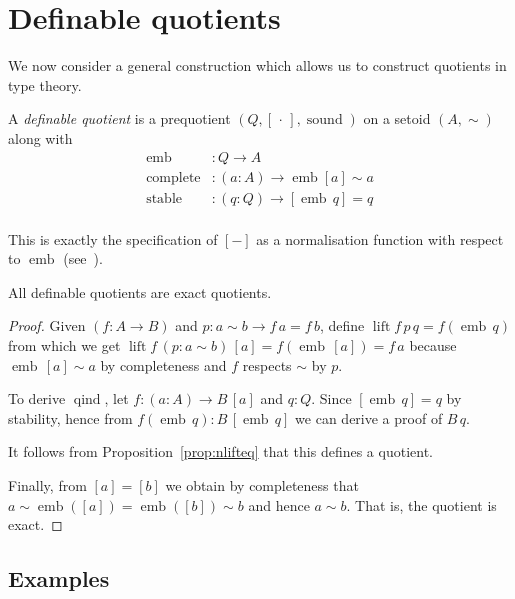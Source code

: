 \documentclass[envcountsame]{llncs}
\newcommand{\dotph}{\,\cdot\,} %
\providecommand{\class}[1]{[#1]}
\DeclareMathOperator{\sound}{sound}
\DeclareMathOperator{\qind}{qind}
\DeclareMathOperator{\emb}{emb}
\DeclareMathOperator{\complete}{complete}
\DeclareMathOperator{\stable}{stable}
\DeclareMathOperator{\lift}{lift}
\renewcommand{\equiv}{=}
\begin{document}
\section{Definable quotients}\label{sec:defquotients}

We now consider a general construction which allows us to construct quotients in type theory.

\begin{definition}\label{def:defquotients}
A \emph{definable quotient} is a prequotient $(Q, \class{\dotph}, \sound)$ on a setoid $(A,\sim)$ along with
\begin{align*}
\emb &: Q \to A\\
\complete &: (a : A) \to \emb {\class a} \sim a\\
\stable &: (q:Q) \to \class{\emb\,q} \equiv q\\
\end{align*}
\end{definition}

This is exactly the specification of  $\class{-}$ as a
normalisation function with respect to $\emb$ (see~\cite{txa:jtait}).

\begin{proposition}\label{prop:definableimpliesexact}
All definable quotients are exact quotients.
\end{proposition}
\begin{proof}

Given $(f\colon A \to B)$ and $p : a\sim b \to f\,a \equiv f\,b$, define $\lift f\, p \,q = f (\emb\,q)$ from which we get $\lift f \,(p : a \sim b)\,\class a\equiv f(\emb\,\class a)\equiv f\,a$ because $\emb\,\class a\sim a$ by completeness and $f$ respects $\sim$ by $p$.

To derive $\qind$, let $f:(a\colon A)\to B\,\class a$ and $q:Q$. Since $ \class{\emb\,q} \equiv q$ by stability, hence from $f (\emb\,q):B\,\class{\emb\,q}$ we can derive a proof of $B\,q$.

It follows from Proposition~\ref{prop:nlifteq} that this defines a quotient.

Finally, from $\class a \equiv \class b$
we obtain by completeness that $a\sim\emb(\class a)\equiv\emb(\class b)\sim b$ and hence $a\sim b$. That is, the quotient is exact.
\end{proof}


\subsection{Examples}\label{sec:dquotients:examples}
\end{document}
